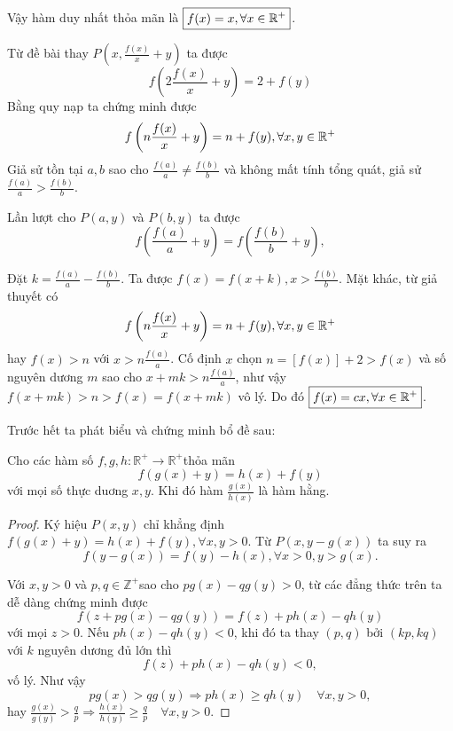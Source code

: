 \documentclass[11pt]{scrartcl}
\begin{document}
\begin{itemize}[label=, leftmargin=0em, itemsep=0.5em]
\begin{sol}
        Vậy hàm duy nhất thỏa mãn là $\boxed{f(x) = x, \forall x\in \mathbb{R^+}}$.

        Từ đề bài thay $P(x, \frac{f(x)}{x} + y)$ ta được 
        \[
            f\left(2\frac{f(x)}{x} + y\right) = 2 + f(y)
        \]
        Bằng quy nạp ta chứng minh được 
        \[
            f\left(n\frac{f(x)}{x} + y\right) = n + f(y),\xyro
        \]
        Giả sử tồn tại $a,b$ sao cho $\frac{f(a)}{a} \neq \frac{f(b)}{b}$ và không mất tính tổng quát, giả sử $\frac{f(a)}{a} > \frac{f(b)}{b}$. 
        
        Lần lượt cho $P(a,y)$ và $P(b,y)$ ta được \[f\left(\frac{f(a)}{a} + y\right) = f\left(\frac{f(b)}{b} + y\right),\tag{2}\]

        Đặt $k = \frac{f(a)}{a} - \frac{f(b)}{b}$. Ta được $f(x) = f(x + k), x > \frac{f(b)}{b}$. Mặt khác, từ giả thuyết có 
        \[
            f\left(n\frac{f(x)}{x} + y\right) = n + f(y), \xyro
        \]
        hay $f(x) > n$ với $x > n\frac{f(a)}{a}$. Cố định $x$ chọn $n = [f(x)] + 2 > f(x)$ và số nguyên dương $m$ sao cho $x + mk  > n\frac{f(a)}{a}$, như vậy $f(x + mk)  > n > f(x) = f(x + mk)$ vô lý. Do đó $\boxed{f(x) = cx, \forall x\in \mathbb{R^+}}$.

         Trước hết ta phát biểu và chứng minh bổ đề sau:
        \begin{lemma}
            Cho các hàm số $f, g, h: \mathbb{R}^{+} \rightarrow \mathbb{R}^{+}$thỏa mãn
            $$
            f(g(x)+y)=h(x)+f(y)
            $$
            với mọi số thực duơng $x, y$. Khi đó hàm $\frac{g(x)}{h(x)}$ là hàm hằng.
        \end{lemma}
        \begin{proof}
            Ký hiệu $P(x, y)$ chỉ khẳng định $f(g(x)+y)=h(x)+f(y), \forall x, y>0$. Từ $P(x, y-g(x))$ ta suy ra
                $$
                f(y-g(x))=f(y)-h(x), \forall x>0, y>g(x) .
                $$

                Với $x, y>0$ và $p, q \in \mathbb{Z}^{+}$sao cho $p g(x)-q g(y)>0$, từ các đẳng thức trên ta dễ dàng chứng minh được
                $$
                f(z+p g(x)-q g(y))=f(z)+p h(x)-q h(y)
                $$
                với mọi $z>0$. Nếu $p h(x)-q h(y)<0$, khi đó ta thay $(p, q)$ bởi $(k p, k q)$ với $k$ nguyên dương đủ lớn thì
                $$
                f(z)+p h(x)-q h(y)<0,
                $$
                vố lý. Như vậy
                $$
                p g(x)>q g(y) \Longrightarrow p h(x) \geq q h(y) \quad \forall x, y>0,
                $$
                hay
                $
                \frac{g(x)}{g(y)}>\frac{q}{p} \Longrightarrow \frac{h(x)}{h(y)} \geq \frac{q}{p} \quad \forall x, y>0 .
                $


\end{proof}
\end{sol}
\end{itemize}
\end{document}
